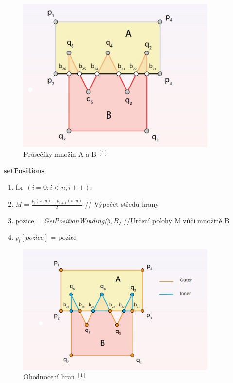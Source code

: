 \documentclass[a4paper, 12pt]{article}
\begin{document}
\begin{figure}[h]
	\centering
	\includegraphics[width=10cm]{pruseciky.jpg}
	\caption{Průsečíky množin A a B $^{[1]}$  }
\end{figure}

\textbf{setPositions}
\begin{enumerate}
	\item for $(i = 0; i < n, i++)$:
	\item \hspace{1cm}$ M = \frac{p_i(x,y)+p_{i+1}(x,y)}{2}$ // Výpočet středu hrany
	\item \hspace{1cm}pozice = \textit{GetPositionWinding($\bar{p},B$)} //Určení polohy M vůči množině B
	\item \hspace{1cm}$p_i[pozice]$ = pozice
\end{enumerate}


\begin{figure}[h]
	\centering
	\includegraphics[width=10cm]{ohodnoceni_hran.jpg}
	\caption{Ohodnocení hran $^{[1]}$ }
\end{figure}
\end{document}
